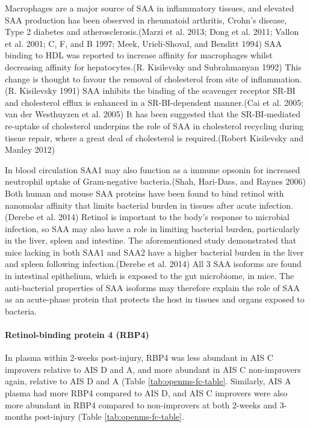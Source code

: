 \documentclass[9pt,lineno]{elife}
\begin{document}
Macrophages are a major source of SAA in inflammatory tissues, and elevated SAA production has been observed in rheumatoid arthritis, Crohn's disease, Type 2 diabetes and atherosclerosis.(Marzi et al. 2013; Dong et al. 2011; Vallon et al. 2001; C, F, and B 1997; Meek, Urieli-Shoval, and Benditt 1994)
SAA binding to HDL was reported to increase affinity for macrophages whilst decreasing affinity for hepatocytes.(R. Kisilevsky and Subrahmanyan 1992)
This change is thought to favour the removal of cholesterol from site of inflammation.(R. Kisilevsky 1991)
SAA inhibits the binding of the scavenger receptor SR-BI and cholesterol efflux is enhanced in a SR-BI-dependent manner.(Cai et al. 2005; van der Westhuyzen et al. 2005)
It has been suggested that the SR-BI-mediated re-uptake of cholesterol underpins the role of SAA in cholesterol recycling during tissue repair, where a great deal of cholesterol is required.(Robert Kisilevsky and Manley 2012)

In blood circulation SAA1 may also function as a immune opsonin for increased neutrophil uptake of Gram-negative bacteria.(Shah, Hari-Dass, and Raynes 2006)
Both human and mouse SAA proteins have been found to bind retinol with nanomolar affinity that limits bacterial burden in tissues after acute infection.(Derebe et al. 2014)
Retinol is important to the body's response to microbial infection, so SAA may also have a role in limiting bacterial burden, particularly in the liver, spleen and intestine.
The aforementioned study demonstrated that mice lacking in both SAA1 and SAA2 have a higher bacterial burden in the liver and spleen following infection.(Derebe et al. 2014)
All 3 SAA isoforms are found in intestinal epithelium, which is exposed to the gut microbiome, in mice.
The anti-bacterial properties of SAA isoforms may therefore explain the role of SAA as an acute-phase protein that protects the host in tissues and organs exposed to bacteria.

\hypertarget{retinol-binding-protein-4-rbp4}{%
\paragraph{Retinol-binding protein 4 (RBP4)}\label{retinol-binding-protein-4-rbp4}}

In plasma within 2-weeks post-injury, RBP4 was less abundant in AIS C improvers relative to AIS D and A, and more abundant in AIS C non-improvers again, relative to AIS D and A (Table \ref{tab:openms-fc-table}.
Similarly, AIS A plasma had more RBP4 compared to AIS D, and AIS C improvers were also more abundant in RBP4 compared to non-improvers at both 2-weeks and 3-months post-injury (Table \ref{tab:openms-fc-table}.
\end{document}
